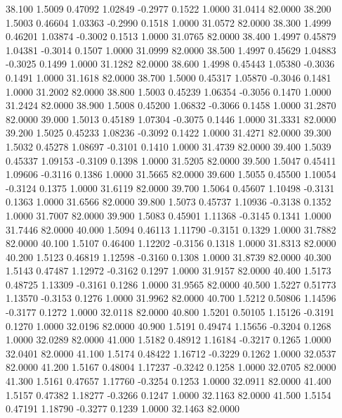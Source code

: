   38.100   1.5009   0.47092   1.02849  -0.2977   0.1522   1.0000  31.0414  82.0000
  38.200   1.5003   0.46604   1.03363  -0.2990   0.1518   1.0000  31.0572  82.0000
  38.300   1.4999   0.46201   1.03874  -0.3002   0.1513   1.0000  31.0765  82.0000
  38.400   1.4997   0.45879   1.04381  -0.3014   0.1507   1.0000  31.0999  82.0000
  38.500   1.4997   0.45629   1.04883  -0.3025   0.1499   1.0000  31.1282  82.0000
  38.600   1.4998   0.45443   1.05380  -0.3036   0.1491   1.0000  31.1618  82.0000
  38.700   1.5000   0.45317   1.05870  -0.3046   0.1481   1.0000  31.2002  82.0000
  38.800   1.5003   0.45239   1.06354  -0.3056   0.1470   1.0000  31.2424  82.0000
  38.900   1.5008   0.45200   1.06832  -0.3066   0.1458   1.0000  31.2870  82.0000
  39.000   1.5013   0.45189   1.07304  -0.3075   0.1446   1.0000  31.3331  82.0000
  39.200   1.5025   0.45233   1.08236  -0.3092   0.1422   1.0000  31.4271  82.0000
  39.300   1.5032   0.45278   1.08697  -0.3101   0.1410   1.0000  31.4739  82.0000
  39.400   1.5039   0.45337   1.09153  -0.3109   0.1398   1.0000  31.5205  82.0000
  39.500   1.5047   0.45411   1.09606  -0.3116   0.1386   1.0000  31.5665  82.0000
  39.600   1.5055   0.45500   1.10054  -0.3124   0.1375   1.0000  31.6119  82.0000
  39.700   1.5064   0.45607   1.10498  -0.3131   0.1363   1.0000  31.6566  82.0000
  39.800   1.5073   0.45737   1.10936  -0.3138   0.1352   1.0000  31.7007  82.0000
  39.900   1.5083   0.45901   1.11368  -0.3145   0.1341   1.0000  31.7446  82.0000
  40.000   1.5094   0.46113   1.11790  -0.3151   0.1329   1.0000  31.7882  82.0000
  40.100   1.5107   0.46400   1.12202  -0.3156   0.1318   1.0000  31.8313  82.0000
  40.200   1.5123   0.46819   1.12598  -0.3160   0.1308   1.0000  31.8739  82.0000
  40.300   1.5143   0.47487   1.12972  -0.3162   0.1297   1.0000  31.9157  82.0000
  40.400   1.5173   0.48725   1.13309  -0.3161   0.1286   1.0000  31.9565  82.0000
  40.500   1.5227   0.51773   1.13570  -0.3153   0.1276   1.0000  31.9962  82.0000
  40.700   1.5212   0.50806   1.14596  -0.3177   0.1272   1.0000  32.0118  82.0000
  40.800   1.5201   0.50105   1.15126  -0.3191   0.1270   1.0000  32.0196  82.0000
  40.900   1.5191   0.49474   1.15656  -0.3204   0.1268   1.0000  32.0289  82.0000
  41.000   1.5182   0.48912   1.16184  -0.3217   0.1265   1.0000  32.0401  82.0000
  41.100   1.5174   0.48422   1.16712  -0.3229   0.1262   1.0000  32.0537  82.0000
  41.200   1.5167   0.48004   1.17237  -0.3242   0.1258   1.0000  32.0705  82.0000
  41.300   1.5161   0.47657   1.17760  -0.3254   0.1253   1.0000  32.0911  82.0000
  41.400   1.5157   0.47382   1.18277  -0.3266   0.1247   1.0000  32.1163  82.0000
  41.500   1.5154   0.47191   1.18790  -0.3277   0.1239   1.0000  32.1463  82.0000
